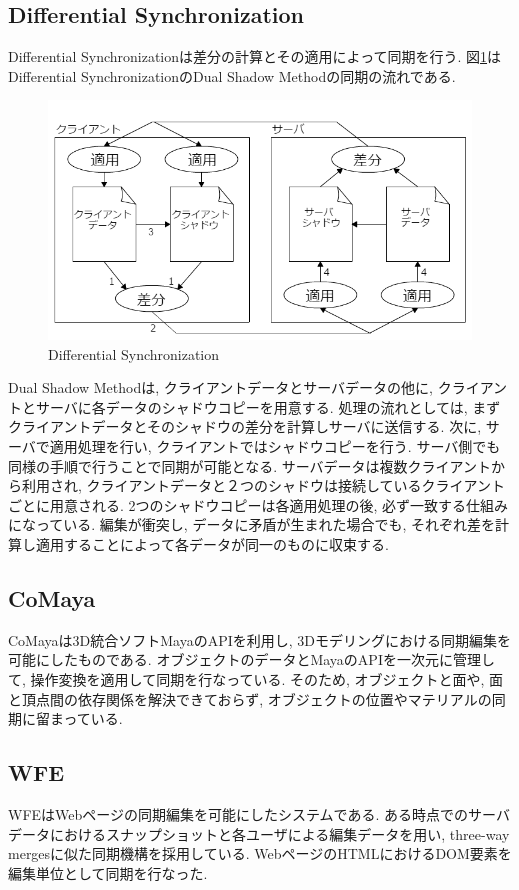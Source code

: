 \subsection{Differential Synchronization}
Differential Synchronization\cite{DS}は差分の計算とその適用によって同期を行う. 図\ref{DSfig}はDifferential SynchronizationのDual Shadow Methodの同期の流れである.
\begin{figure}[htbp]
  \begin{center}
    \includegraphics[scale=0.7]{images/DS}
    \caption{Differential Synchronization}
    \label{DSfig}
  \end{center}
\end{figure}
Dual Shadow Methodは, クライアントデータとサーバデータの他に, クライアントとサーバに各データのシャドウコピーを用意する. 処理の流れとしては, まずクライアントデータとそのシャドウの差分を計算しサーバに送信する. 次に, サーバで適用処理を行い, クライアントではシャドウコピーを行う. サーバ側でも同様の手順で行うことで同期が可能となる. サーバデータは複数クライアントから利用され, クライアントデータと２つのシャドウは接続しているクライアントごとに用意される. 2つのシャドウコピーは各適用処理の後, 必ず一致する仕組みになっている. 編集が衝突し, データに矛盾が生まれた場合でも, それぞれ差を計算し適用することによって各データが同一のものに収束する.
%
\subsection{CoMaya}
CoMaya\cite{COMAYA}は3D統合ソフトMayaのAPIを利用し, 3Dモデリングにおける同期編集を可能にしたものである. オブジェクトのデータとMayaのAPIを一次元に管理して, 操作変換を適用して同期を行なっている. そのため, オブジェクトと面や, 面と頂点間の依存関係を解決できておらず, オブジェクトの位置やマテリアルの同期に留まっている.
%
\subsection{WFE}
WFE\cite{WFE}はWebページの同期編集を可能にしたシステムである. ある時点でのサーバデータにおけるスナップショットと各ユーザによる編集データを用い, three-way mergesに似た同期機構を採用している. WebページのHTMLにおけるDOM要素を編集単位として同期を行なった.
